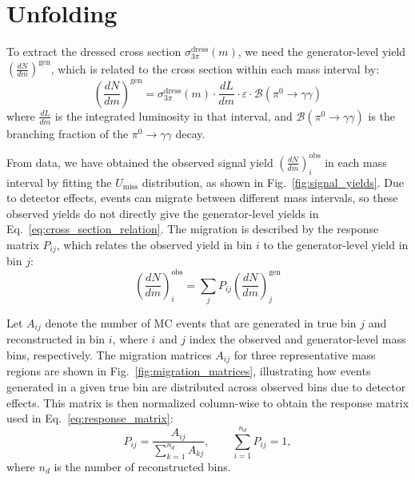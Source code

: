 \clearpage
\section{Unfolding}
\label{sec:unfolding}

To extract the dressed cross section $\sigma_{3\pi}^{\text{dress}}(m)$, we need
the generator-level yield $\left( \frac{dN}{dm} \right)^{\text{gen}}$, which is
related to the cross section within each mass interval by:
\begin{equation}
    \left( \frac{dN}{dm} \right)^{\text{gen}} = \sigma_{3\pi}^{\text{dress}}(m) \cdot \frac{dL}{dm} \cdot \varepsilon \cdot \mathcal{B}(\pi^0 \to \gamma\gamma)
    \label{eq:cross_section_relation}
\end{equation}
where $\frac{dL}{dm}$ is the integrated luminosity in that interval, and $\mathcal{B}(\pi^0 \to \gamma\gamma)$ is the branching fraction of the $\pi^0 \to \gamma\gamma$ decay.

From data, we have obtained the observed signal yield $\left( \frac{dN}{dm}
    \right)_{i}^{\text{obs}}$ in each mass interval by fitting the
$U_{\text{miss}}$ distribution, as shown in Fig.~\ref{fig:signal_yields}. Due
to detector effects, events can migrate between different mass intervals, so
these observed yields do not directly give the generator-level yields in
Eq.~\eqref{eq:cross_section_relation}. The migration is described by the
response matrix $P_{ij}$, which relates the observed yield in bin $i$ to the
generator-level yield in bin $j$:
\begin{equation}
    \left( \frac{dN}{dm} \right)_{i}^{\text{obs}} = \sum_{j} P_{ij} \left( \frac{dN}{dm} \right)_{j}^{\text{gen}}
    \label{eq:response_matrix}
\end{equation}

Let $A_{ij}$ denote the number of MC events that are generated in true bin $j$
and reconstructed in bin $i$, where $i$ and $j$ index the observed and
generator-level mass bins, respectively. The migration matrices $A_{ij}$ for
three representative mass regions are shown in
Fig.~\ref{fig:migration_matrices}, illustrating how events generated in a given
true bin are distributed across observed bins due to detector effects. This
matrix is then normalized column-wise to obtain the response matrix used in
Eq.~\eqref{eq:response_matrix}:
\begin{equation}
    P_{ij} = \frac{A_{ij}}{\sum_{k=1}^{n_d} A_{kj}}, \qquad \sum_{i=1}^{n_d} P_{ij} = 1,
    \label{eq:response_matrix_norm}
\end{equation}
where $n_d$ is the number of reconstructed bins.

